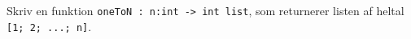 Skriv en funktion \lstinline{oneToN : n:int -> int list}, som returnerer listen af heltal \lstinline{[1; 2; ...; n]}.
